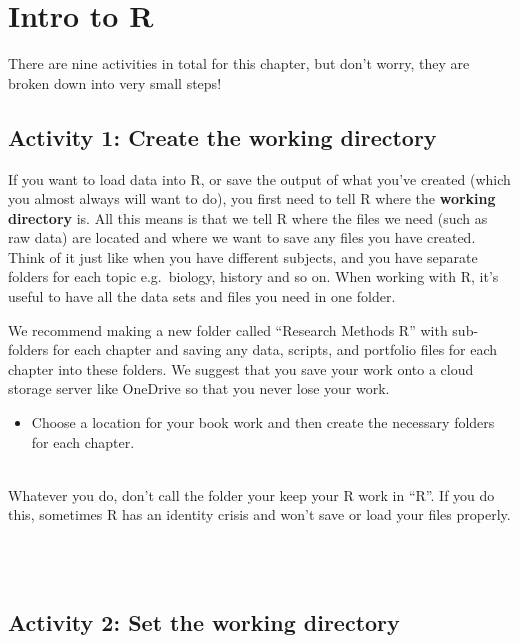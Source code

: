 \documentclass[]{book}
\providecommand{\tightlist}{%
  \setlength{\itemsep}{0pt}\setlength{\parskip}{0pt}}
\newenvironment{warning}
    {
    \hline\\
    }
    { 
    \\\\\hline
    }
\begin{document}
\hypertarget{ref2}{%
\chapter{Intro to R}\label{ref2}}

There are nine activities in total for this chapter, but don't worry, they are broken down into very small steps!

\hypertarget{activity-1-create-the-working-directory}{%
\section{Activity 1: Create the working directory}\label{activity-1-create-the-working-directory}}

If you want to load data into R, or save the output of what you've created (which you almost always will want to do), you first need to tell R where the \textbf{working directory} is. All this means is that we tell R where the files we need (such as raw data) are located and where we want to save any files you have created. Think of it just like when you have different subjects, and you have separate folders for each topic e.g.~biology, history and so on. When working with R, it's useful to have all the data sets and files you need in one folder.

We recommend making a new folder called ``Research Methods R'' with sub-folders for each chapter and saving any data, scripts, and portfolio files for each chapter into these folders. We suggest that you save your work onto a cloud storage server like OneDrive so that you never lose your work.

\begin{itemize}
\tightlist
\item
  Choose a location for your book work and then create the necessary folders for each chapter.
\end{itemize}

\begin{warning}
Whatever you do, don't call the folder your keep your R work in ``R''.
If you do this, sometimes R has an identity crisis and won't save or
load your files properly.
\end{warning}

\hypertarget{activity-2-set-the-working-directory}{%
\section{Activity 2: Set the working directory}\label{activity-2-set-the-working-directory}}
\end{document}
